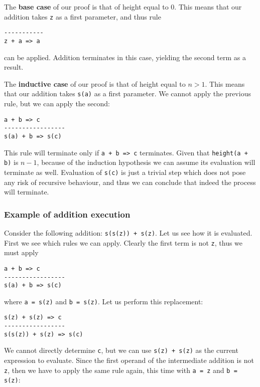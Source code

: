 The \textbf{base case} of our proof is that of height equal to $0$. This means that our addition takes \texttt{z} as a first parameter, and thus rule 

\begin{lstlisting}
-----------
z + a => a
\end{lstlisting}

can be applied. Addition terminates in this case, yielding the second term as a result.

The \textbf{inductive case} of our proof is that of height equal to $n>1$. This means that our addition takes \texttt{s(a)} as a first parameter. We cannot apply the previous rule, but we can apply the second:

\begin{lstlisting}
a + b => c
-----------------
s(a) + b => s(c)
\end{lstlisting}

This rule will terminate only if \texttt{a + b => c} terminates. Given that \texttt{height(a + b)} is $n-1$, because of the induction hypothesis we can assume its evaluation will terminate as well. Evaluation of \texttt{s(c)} is just a trivial step which does not pose any risk of recursive behaviour, and thus we can conclude that indeed the process will terminate.

\subsubsection{Example of addition execution}
Consider the following addition: \texttt{s(s(z)) + s(z)}. Let us see how it is evaluated. First we see which rules we can apply. Clearly the first term is not \texttt{z}, thus we must apply

\begin{lstlisting}
a + b => c
-----------------
s(a) + b => s(c)
\end{lstlisting}

where \texttt{a = s(z)} and \texttt{b = s(z)}. Let us perform this replacement:

\begin{lstlisting}
s(z) + s(z) => c
-----------------
s(s(z)) + s(z) => s(c)
\end{lstlisting}

We cannot directly determine \texttt{c}, but we can use \texttt{s(z) + s(z)} as the current expression to evaluate.  Since the first operand of the intermediate addition is not \texttt{z}, then we have to apply the same rule again, this time with \texttt{a = z} and \texttt{b = s(z)}:

